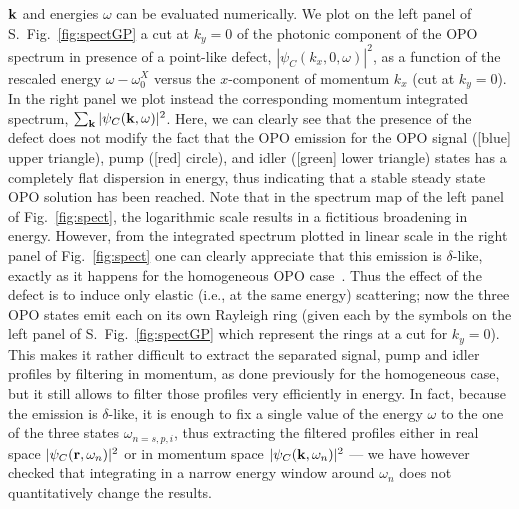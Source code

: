 ${\mathbf k}$ and energies $\omega$ can be evaluated numerically.
%
We plot on the left panel of S.~Fig.~\ref{fig:spectGP} a cut at $k_y=0$
of the photonic component of the OPO spectrum in presence of a
point-like defect, $|\psi_C(k_x,0,\omega)|^2$, as a function of the
rescaled energy $\omega - \omega_0^X$ versus the $x$-component of
momentum $k_x$ (cut at $k_y=0$). In the right panel we plot instead
the corresponding momentum integrated spectrum, $\sum_{{\mathbf k}}
|\psi_C({\mathbf k},\omega)|^2$.
%
Here, we can clearly see that the presence of the defect does not
modify the fact that the OPO emission for the OPO signal ([blue] upper
triangle), pump ([red] circle), and idler ([green] lower triangle)
states has a completely flat dispersion in energy, thus indicating
that a stable steady state OPO solution has been reached. Note that in
the spectrum map of the left panel of Fig.~\ref{fig:spect}, the
logarithmic scale results in a fictitious broadening in
energy. However, from the integrated spectrum plotted in linear scale
in the right panel of Fig.~\ref{fig:spect} one can clearly appreciate
that this emission is $\delta$-like, exactly as it happens for the
homogeneous OPO case~\cite{9783642241857}.
%
Thus the effect of the defect is to induce only elastic (i.e., at the
same energy) scattering; now the three OPO states emit each on its own
Rayleigh ring (given each by the symbols on the left panel of
S.~Fig.~\ref{fig:spectGP} which represent the rings at a cut for
$k_y=0$). This makes it rather difficult to extract the separated
signal, pump and idler profiles by filtering in momentum, as done
previously for the homogeneous case, but it still allows to filter
those profiles very efficiently in energy. In fact, because the
emission is $\delta$-like, it is enough to fix a single value of the
energy $\omega$ to the one of the three states $\omega_{n=s,p,i}$,
thus extracting the filtered profiles either in real space
$|\psi_C({\mathbf r},\omega_n)|^2$ or in momentum space
$|\psi_C({\mathbf k},\omega_n)|^2$ --- we have however checked that
integrating in a narrow energy window around $\omega_n$ does not
quantitatively change the results.

